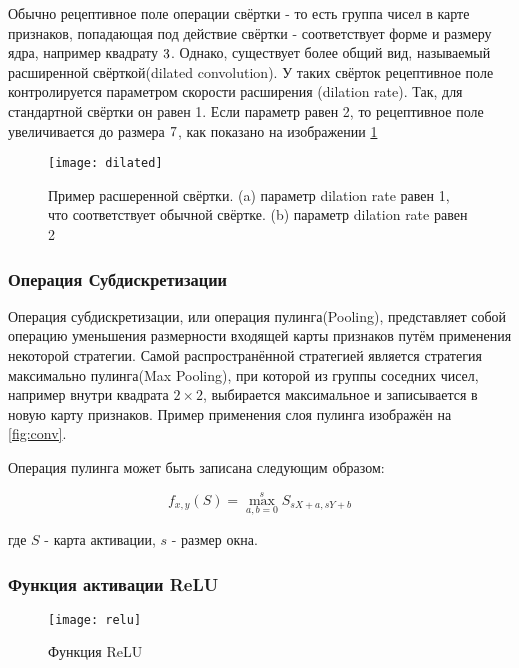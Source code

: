 Обычно рецептивное поле операции свёртки - то есть группа чисел в карте признаков, попадающая под действие свёртки -
соответствует форме и размеру ядра, например квадрату $3 \time 3$. Однако, существует более общий вид,
называемый расширенной свёрткой(dilated convolution)\cite{Dilated}. У таких свёрток рецептивное поле контролируется параметром скорости
расширения (dilation rate). Так, для стандартной свёртки он равен 1. Если параметр равен 2, то рецептивное поле увеличивается
до размера $7 \time 7$, как показано на изображении \ref{fig:dilated}

\begin{figure}[h]
    \centering
    \texttt{[image: dilated]}
    \caption{Пример расшеренной свёртки.     (a) параметр dilation rate равен 1, что соответствует обычной свёртке. (b) параметр dilation rate равен 2}
    \label{fig:dilated}
\end{figure}


\subsubsection{Операция Субдискретизации}

Операция субдискретизации, или операция пулинга(Pooling), представляет собой операцию уменьшения размерности входящей карты признаков 
путём применения некоторой стратегии. Самой распространённой стратегией является стратегия максимально пулинга(Max Pooling),
при которой из группы соседних чисел, например внутри квадрата $2 \times 2$, выбирается максимальное и записывается в новую
карту признаков. Пример применения слоя пулинга изображён на \ref{fig:conv}.


Операция пулинга может быть записана следующим образом:

\begin{equation}
    f_{x,y}(S) = \max_{a,b=0}^{s}S_{sX+a, sY+b}
\end{equation}

где $S$ - карта активации, $s$ - размер окна.

\subsubsection{Функция активации ReLU}

\begin{figure}[h]
    \centering
    \texttt{[image: relu]}
    \caption{Функция ReLU}
    \label{fig:relu}
\end{figure}

